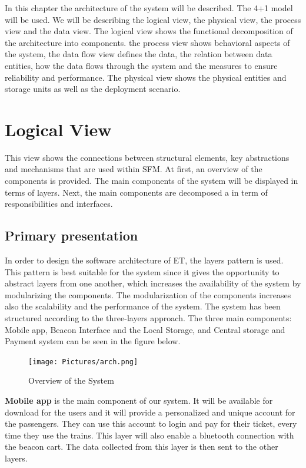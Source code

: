 In this chapter the architecture of the system will be described. The 4+1 model will be used. We will be describing  the logical view, the physical view, the process view and the data view. 
The logical view shows the functional decomposition of the architecture into components.
the process view shows behavioral aspects of the system, the data flow view defines the data, the relation
between data entities, how the data flows through the system and the measures to ensure reliability and
performance. The physical view shows the physical entities and storage units as well as the deployment
scenario.

\section{Logical View}
This view shows the connections between structural elements, key abstractions and mechanisms that are used within SFM. At first, an overview of the components is provided. The main components of the system will be displayed in terms of layers. Next, the main components are decomposed a in term of responsibilities and interfaces.

\subsection{Primary presentation}
In order to design the software architecture of \ac{ET}, the layers pattern is used. This pattern is best suitable for the system since it gives the opportunity to abstract layers from one another, which increases the availability of the system by modularizing the components. The modularization of the components increases also the scalability and the performance of the system. 
The system has been structured according to the three-layers approach. The three main components: Mobile app, Beacon Interface and the Local Storage, and Central storage and Payment system can be seen in the figure below. 


\begin{figure}[H]
  \centering
  \texttt{[image: Pictures/arch.png]}
  \caption{Overview of the System}
  \label{fig:system}
\end{figure}


\textbf{Mobile app} is the main component of our system. It will be available for download for the users and it will provide a personalized and unique account for the passengers. They can use this account to login and pay for their ticket, every time they use the trains. This layer will also enable a bluetooth connection with the beacon cart. The data collected from this layer is then sent to the other layers. 

